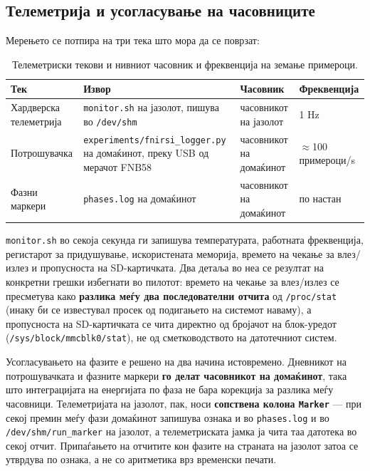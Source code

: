 \subsection{Телеметрија и усогласување на часовниците}

Мерењето се потпира на три тека што мора да се поврзат:

\begin{table}[htbp]
\centering
\caption{Телеметриски текови и нивниот часовник и фреквенција на земање примероци.}
\label{tab:telemetry-streams}
\begin{tabular}{llll}
\toprule
Тек & Извор & Часовник & Фреквенција \\
\midrule
Хардверска телеметрија & \texttt{monitor.sh} на јазолот, пишува во \texttt{/dev/shm} & часовникот на јазолот & 1 Hz \\
Потрошувачка & \texttt{experiments/fnirsi\_logger.py} на домаќинот, преку USB од мерачот FNB58 & часовникот на домаќинот & $\approx$100 примероци/s \\
Фазни маркери & \texttt{phases.log} на домаќинот & часовникот на домаќинот & по настан \\
\bottomrule
\end{tabular}
\end{table}

\texttt{monitor.sh} во секоја секунда ги запишува температурата, работната фреквенција, регистарот
за придушување, искористената меморија, времето на чекање за влез/излез и пропусноста на
SD-картичката. Два детаља во неа се резултат на конкретни грешки избегнати во пилотот:
времето на чекање за влез/излез се пресметува како \textbf{разлика меѓу два последователни
отчита} од \texttt{/proc/stat} (инаку би се известувал просек од подигањето на системот наваму), а
пропусноста на SD-картичката се чита директно од бројачот на блок-уредот
(\texttt{/sys/block/mmcblk0/stat}), не од сметководството на датотечниот систем.

Усогласувањето на фазите е решено на два начина истовремено. Дневникот на потрошувачката и
фазните маркери \textbf{го делат часовникот на домаќинот}, така што интеграцијата на енергијата
по фаза не бара корекција за разлика меѓу часовници. Телеметријата на јазолот, пак, носи
\textbf{сопствена колона \texttt{Marker}} --- при секој премин меѓу фази домаќинот запишува ознака и во
\texttt{phases.log} и во \texttt{/dev/shm/run\_marker} на јазолот, а телеметриската јамка ја чита таа
датотека во секој отчит. Припаѓањето на отчитите кон фазите на страната на јазолот затоа се
утврдува по ознака, а не со аритметика врз временски печати.


